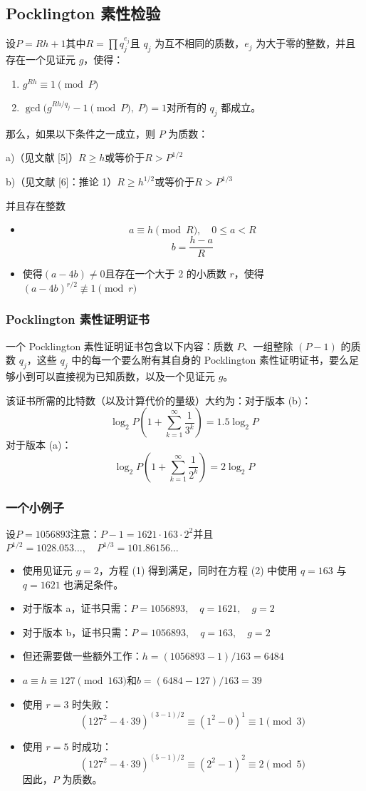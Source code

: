 \subsection{Pocklington 素性检验}
设$P = Rh + 1$其中$R = \prod q_j^{e_j}$且 $q_j$ 为互不相同的质数，$e_j$ 为大于零的整数，并且存在一个见证元 $g$，使得：
\begin{enumerate}
\item $g^{Rh} \equiv 1 \pmod{P}$
\item $\gcd\big(g^{Rh/q_j} - 1 \pmod{P},\; P\big) = 1$对所有的 $q_j$ 都成立。
\end{enumerate}
那么，如果以下条件之一成立，则 $P$ 为质数：

a)（见文献 [5]）$R \geq h$或等价于$R > P^{1/2}$

b)（见文献 [6]：推论 1）$R \geq h^{1/2}$或等价于$R > P^{1/3}$

并且存在整数
\begin{itemize}
\item 
$$
a \equiv h \pmod{R}, \quad 0 \leq a < R~
$$
$$
b = \frac{h - a}{R}~
$$
\item 使得$(a - 4b) \neq 0$且存在一个大于 2 的小质数 $r$，使得$(a - 4b)^{r/2} \not\equiv 1 \pmod{r}$
\end{itemize}
\subsubsection{Pocklington 素性证明证书}
一个 Pocklington 素性证明证书包含以下内容：质数 $P$、一组整除 $(P-1)$ 的质数 $q_j$，这些 $q_j$ 中的每一个要么附有其自身的 Pocklington 素性证明证书，要么足够小到可以直接视为已知质数，以及一个见证元 $g$。

该证书所需的比特数（以及计算代价的量级）大约为：对于版本 (b)：
$$
\log_{2} P \left( 1 + \sum_{k=1}^{\infty} \frac{1}{3^k} \right) = 1.5 \log_{2} P~
$$
对于版本 (a)：
$$
\log_{2} P \left( 1 + \sum_{k=1}^{\infty} \frac{1}{2^k} \right) = 2 \log_{2} P~
$$
\subsubsection{一个小例子}
设$P = 1056893$注意：$P - 1 = 1621 \cdot 163 \cdot 2^{2}$并且$P^{1/2} = 1028.053\ldots, \quad P^{1/3} = 101.86156\ldots$
\begin{itemize}
\item 使用见证元 $g = 2$，方程 (1) 得到满足，同时在方程 (2) 中使用 $q = 163$ 与 $q = 1621$ 也满足条件。
\item 对于版本 a，证书只需：$P = 1056893, \quad q = 1621, \quad g = 2$
\item 对于版本 b，证书只需：$P = 1056893, \quad q = 163, \quad g = 2$
\item 但还需要做一些额外工作：$h = (1056893 - 1)/163 = 6484$
\item $a \equiv h \equiv 127 \pmod{163}$和$b = (6484 - 127)/163= 39$
\item 使用 $r = 3$ 时失败：
$$
\left(127^2 - 4 \cdot 39\right)^{(3-1)/2} \equiv (1^2 - 0)^{1} \equiv 1 \pmod{3}~
$$
\item 使用 $r = 5$ 时成功：
$$
\left(127^2 - 4 \cdot 39\right)^{(5-1)/2} \equiv (2^2 - 1)^2 \equiv 2 \pmod{5}~
$$
因此，$P$ 为质数。
\end{itemize}
